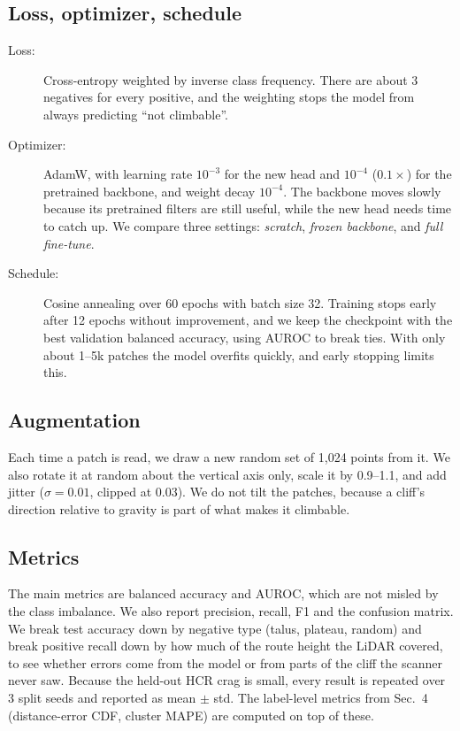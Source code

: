 \documentclass{mva2011}
\begin{document}
\subsection{Loss, optimizer, schedule}
    \begin{description}
    \item[Loss:] Cross-entropy weighted by inverse class frequency. There are about 3 negatives for every positive, and the weighting stops the model from always predicting ``not climbable''.
    \item[Optimizer:] AdamW, with learning rate $10^{-3}$ for the new head and $10^{-4}$ ($0.1\times$) for the pretrained backbone, and weight decay $10^{-4}$. The backbone moves slowly because its pretrained filters are still useful, while the new head needs time to catch up. We compare three settings: \emph{scratch}, \emph{frozen backbone}, and \emph{full fine-tune}.
    \item[Schedule:] Cosine annealing over 60 epochs with batch size 32. Training stops early after 12 epochs without improvement, and we keep the checkpoint with the best validation balanced accuracy, using AUROC to break ties. With only about 1--5k patches the model overfits quickly, and early stopping limits this.
    \end{description}

\subsection{Augmentation}
    Each time a patch is read, we draw a new random set of 1,024 points from it. We also rotate it at random about the vertical axis only, scale it by 0.9--1.1, and add jitter ($\sigma=0.01$, clipped at $0.03$). We do not tilt the patches, because a cliff's direction relative to gravity is part of what makes it climbable.

\subsection{Metrics}
    The main metrics are balanced accuracy and AUROC, which are not misled by the class imbalance. We also report precision, recall, F1 and the confusion matrix. We break test accuracy down by negative type (talus, plateau, random) and break positive recall down by how much of the route height the LiDAR covered, to see whether errors come from the model or from parts of the cliff the scanner never saw. Because the held-out HCR crag is small, every result is repeated over 3 split seeds and reported as mean $\pm$ std. The label-level metrics from Sec.~4 (distance-error CDF, cluster MAPE) are computed on top of these.
\end{document}
